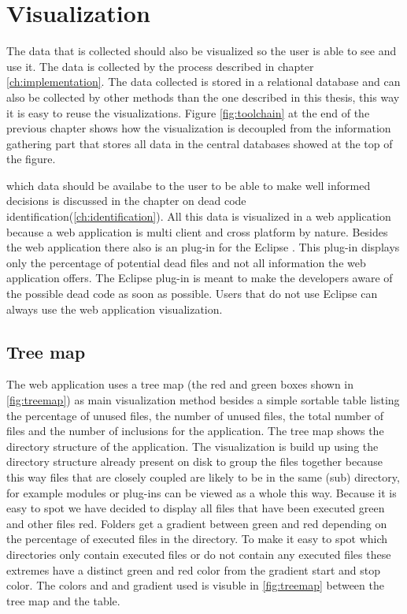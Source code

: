 \chapter{Visualization\label{ch:visualization}}
\label{sec:visualization}

The data that is collected should also be visualized so the user is able to see and use it. The data is collected by the process described in chapter \ref{ch:implementation}. The data collected is stored in a relational database and can also be collected by other methods than the one described in this thesis, this way it is easy to reuse the visualizations. Figure \ref{fig:toolchain} at the end of the previous chapter shows how the visualization is decoupled from the information gathering part that stores all data in the central databases showed at the top of the figure. 

which data should be availabe to the user to be able to make well informed decisions is discussed in the chapter on dead code identification(\autoref{ch:identification}). All this data is visualized in a web application because a web application is multi client and cross platform by nature. Besides the web application there also is an plug-in for the Eclipse \ide. This plug-in displays only the percentage of potential dead files and not all information the web application offers. The Eclipse plug-in is meant to make the developers aware of the possible dead code as soon as possible. Users that do not use Eclipse can always use the web application visualization.


\section{Tree map}

The web application uses a tree map \cite{johnson1991} (the red and green boxes shown in \autoref{fig:treemap}) as main visualization method besides a simple sortable table listing the percentage of unused files, the number of unused files, the total number of files and the number of inclusions for the application. The tree map shows the directory structure of the application. The visualization is build up using the directory structure already present on disk to group the files together because this way files that are closely coupled are likely to be in the same (sub) directory, for example modules or plug-ins can be viewed as a whole this way. Because it is easy to spot we have decided to display all files that have been executed green and other files red. Folders get a gradient between green and red depending on the percentage of executed files in the directory. To make it easy to spot which directories only contain executed files or do not contain any executed files these extremes have a distinct green and red color from the gradient start and stop color. The colors and and gradient used is visuble in \autoref{fig:treemap} between the tree map and the table. 

